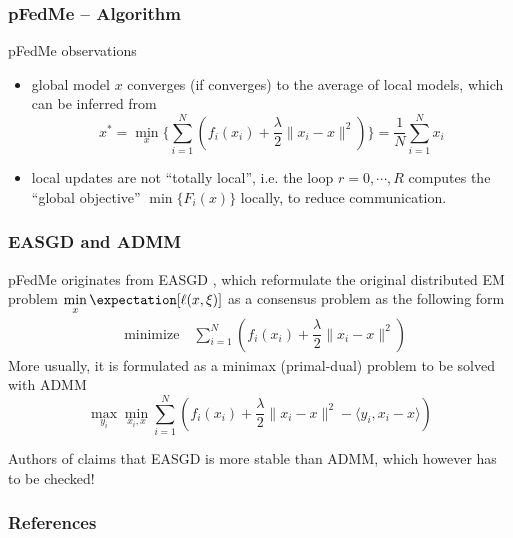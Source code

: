 \begin{frame}
\frametitle{pFedMe -- Algorithm}

\begin{block}{pFedMe observations}
\begin{itemize}
    \item global model $x$ converges (if converges) to the average of local models, which can be inferred from
    $$x^* = \min_{x} \{ \sum\limits_{i=1}^N \left( f_i(x_i) + \dfrac{\lambda}{2} \lVert x_i - x \rVert^2 \right) \} = \frac{1}{N} \sum\limits_{i=1}^N x_i$$
    \item local updates are not ``totally local'', i.e. the loop $r = 0, \cdots, R$ computes the ``global objective'' $\min\{F_i(x)\}$ locally, to reduce communication.
\end{itemize}
\end{block}

\end{frame}


\begin{frame}
\frametitle{EASGD and ADMM}

pFedMe originates from EASGD \cite{zhang2015easgd}, which reformulate the original distributed EM problem $\displaystyle \min_x \expectation [\ell(x,\xi)]$ as a consensus problem as the following form
\begin{align*}
    & \text{minimize} \quad \sum\limits_{i=1}^N \left( f_i(x_i) + \dfrac{\lambda}{2} \lVert x_i - x \rVert^2 \right)
\end{align*}
More usually, it is formulated as a minimax (primal-dual) problem to be solved with ADMM
$$\max_{y_i}\min_{x_i,x} \sum_{i=1}^N \left( f_i(x_i) + \dfrac{\lambda}{2} \lVert x_i - x \rVert^2 - \langle y_i, x_i-x \rangle \right)$$

Authors of \cite{zhang2015easgd} claims that EASGD is more stable than ADMM, which however has to be checked!

\end{frame}






\begin{frame}[allowframebreaks]
\frametitle{References}

{\footnotesize


}

\end{frame}



